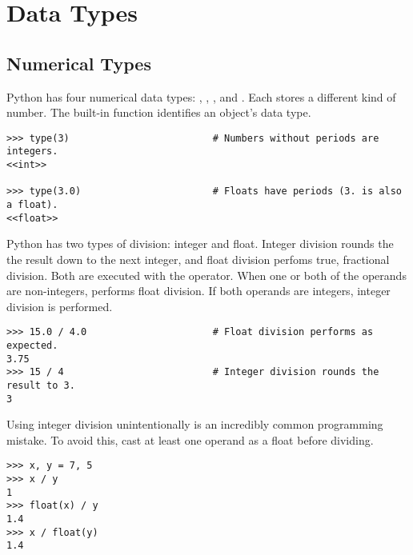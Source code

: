 \section*{Data Types} %

\subsection*{Numerical Types} %

Python has four numerical data types: , , 
, and .
Each stores a different kind of number.
The built-in function  identifies an object's data type.

\begin{lstlisting}
>>> type(3)                         # Numbers without periods are integers.
<<int>>

>>> type(3.0)                       # Floats have periods (3. is also a float).
<<float>>
\end{lstlisting}

Python has two types of division: integer and float.
Integer division rounds the the result down to the next integer, and float division perfoms true, fractional division.
Both are executed  with the \li{/} operator.
When one or both of the operands are non-integers, \li{/} performs float division.
If both operands are integers, integer division is performed.

\begin{lstlisting}
>>> 15.0 / 4.0                      # Float division performs as expected.
3.75
>>> 15 / 4                          # Integer division rounds the result to 3.
3
\end{lstlisting}

\begin{warn} %
Using integer division unintentionally is an incredibly common programming mistake.
To avoid this, cast at least one operand as a float before dividing.
\begin{lstlisting}
>>> x, y = 7, 5
>>> x / y
1
>>> float(x) / y
1.4
>>> x / float(y)
1.4
\end{lstlisting}
\end{warn}

